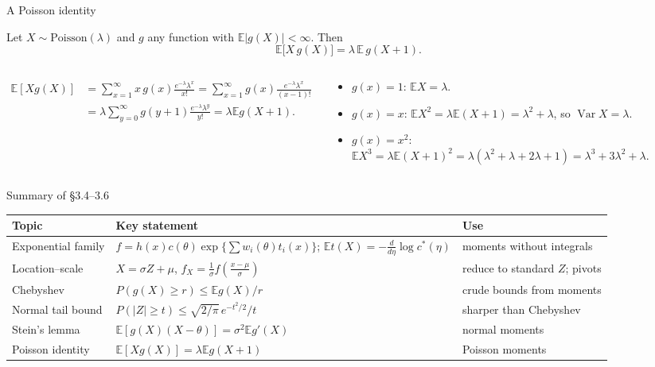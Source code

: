 \documentclass[aspectratio=169,t,10pt]{beamer}
\newcommand{\E}{\mathbb{E}}
\newcommand{\Var}{\operatorname{Var}}
\begin{document}
\begin{frame}{A Poisson identity}
  \begin{tcolorbox}[mythm={Lemma (Poisson identity; CB 3.6.8)}]\small
  Let $X\sim\mathrm{Poisson}(\lambda)$ and $g$ any function with $\E|g(X)|<\infty$. Then
  \[\E\bigl[X\,g(X)\bigr]=\lambda\,\E\,g(X+1).\]
  \end{tcolorbox}
  \begin{columns}[T]
  \begin{tcolorbox}[mynote={Proof}]\small
  \begin{align*}\E[Xg(X)]&=\sum_{x=1}^\infty x\,g(x)\frac{e^{-\lambda}\lambda^x}{x!}=\sum_{x=1}^\infty g(x)\frac{e^{-\lambda}\lambda^x}{(x-1)!}\\&=\lambda\sum_{y=0}^\infty g(y+1)\frac{e^{-\lambda}\lambda^y}{y!}=\lambda\E g(X+1).\end{align*}
  \end{tcolorbox}
  \begin{tcolorbox}[myex={Moments of Poisson$(\lambda)$}]\small
  \begin{itemize}
    \item $g(x)=1$: $\E X=\lambda$.
    \item $g(x)=x$: $\E X^2=\lambda\E(X+1)=\lambda^2+\lambda$, so $\Var X=\lambda$.
    \item $g(x)=x^2$: $\E X^3=\lambda\E(X+1)^2=\lambda(\lambda^2+\lambda+2\lambda+1)=\lambda^3+3\lambda^2+\lambda$.
  \end{itemize}
  \end{tcolorbox}
  \end{columns}
\end{frame}

\begin{frame}{Summary of \S3.4--3.6}
  \small
  \renewcommand{\arraystretch}{1.5}
  \begin{center}
  \begin{tabular}{@{}p{3.1cm}p{6.2cm}p{3.5cm}@{}}
  \textbf{Topic}&\textbf{Key statement}&\textbf{Use}\\\hline
  Exponential family&$f=h(x)c(\theta)\exp\{\sum w_i(\theta)t_i(x)\}$; $\E t(X)=-\frac d{d\eta}\log c^*(\eta)$&moments without integrals\\
  Location--scale&$X=\sigma Z+\mu$, $f_X=\frac1\sigma f(\frac{x-\mu}\sigma)$&reduce to standard $Z$; pivots\\
  Chebyshev&$P(g(X)\ge r)\le\E g(X)/r$&crude bounds from moments\\
  Normal tail bound&$P(|Z|\ge t)\le\sqrt{2/\pi}\,e^{-t^2/2}/t$&sharper than Chebyshev\\
  Stein's lemma&$\E[g(X)(X-\theta)]=\sigma^2\E g'(X)$&normal moments\\
  Poisson identity&$\E[Xg(X)]=\lambda\E g(X+1)$&Poisson moments
  \end{tabular}
  \end{center}
\end{frame}
\end{document}
